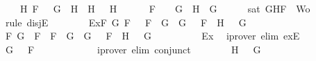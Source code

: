 \begin{isabellebody}
\ \ \ \ {\isacharparenleft}{\isasymexists}H{}{\isachardot}\ F\ {\isacharequal}\ \isactrlbold {\isasymnot}\ {\isacharparenleft}G\ \isactrlbold {\isasymrightarrow}\ H{}{\isacharparenright}\ {\isasymand}\ H\ {\isacharequal}\ \isactrlbold {\isasymnot}\ H{}{\isacharparenright}\ {\isasymor}\ \isanewline
\ \ \ \ F\ {\isacharequal}\ \isactrlbold {\isasymnot}\ {\isacharparenleft}\isactrlbold {\isasymnot}\ G{\isacharparenright}\ {\isasymand}\ H\ {\isacharequal}\ G{\isachardoublequoteclose}\isanewline
\ \ \ \ \isamarkupfalse%
\ {\isachardoublequoteopen}sat\ {\isacharparenleft}{\isacharbraceleft}G{\isacharcomma}H{\isacharcomma}F{\isacharbraceright}\ {\isasymunion}\ Wo{\isacharparenright}{\isachardoublequoteclose}\isanewline
\ \ \ \ \isamarkupfalse%
\ {\isacharparenleft}rule\ disjE{\isacharparenright}\isanewline
\ \ \ \ \ \ \isamarkupfalse%
\ Ex{}{\isacharcolon}{\isachardoublequoteopen}{\isasymexists}F{}\ G{}{\isachardot}\ F\ {\isacharequal}\ \isactrlbold {\isasymnot}\ {\isacharparenleft}F{}\ \isactrlbold {\isasymor}\ G{}{\isacharparenright}\ {\isasymand}\ G\ {\isacharequal}\ \isactrlbold {\isasymnot}\ F{}\ {\isasymand}\ H\ {\isacharequal}\ \isactrlbold {\isasymnot}\ G{}{\isachardoublequoteclose}\ \isanewline
\ \ \ \ \ \ \isamarkupfalse%
\ F{}\ G{}\ \ {}{\isacharcolon}{\isachardoublequoteopen}F\ {\isacharequal}\ \isactrlbold {\isasymnot}{\isacharparenleft}F{}\ \isactrlbold {\isasymor}\ G{}{\isacharparenright}\ {\isasymand}\ G\ {\isacharequal}\ \isactrlbold {\isasymnot}\ F{}\ {\isasymand}\ H\ {\isacharequal}\ \isactrlbold {\isasymnot}\ G{}{\isachardoublequoteclose}\isanewline
\ \ \ \ \ \ \ \ \isamarkupfalse%
\ Ex{}\ \isamarkupfalse%
\ {\isacharparenleft}iprover\ elim{\isacharcolon}\ exE{\isacharparenright}\isanewline
\ \ \ \ \ \ \isamarkupfalse%
\ {\isachardoublequoteopen}G\ {\isacharequal}\ \isactrlbold {\isasymnot}\ F{}{\isachardoublequoteclose}\isanewline
\ \ \ \ \ \ \ \ \isamarkupfalse%
\ {}\ \isamarkupfalse%
\ {\isacharparenleft}iprover\ elim{\isacharcolon}\ conjunct{}{\isacharparenright}\isanewline
\ \ \ \ \ \ \isamarkupfalse%
\ {\isachardoublequoteopen}H\ {\isacharequal}\ \isactrlbold {\isasymnot}\ G{}{\isachardoublequoteclose}\isanewline

\end{isabellebody}
